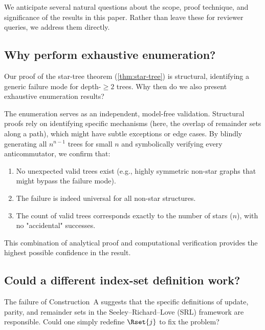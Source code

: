 %

We anticipate several natural questions about the scope, proof
technique, and significance of the results in this paper.  Rather than
leave these for reviewer queries, we address them directly.

\subsection{Why perform exhaustive enumeration?}
\label{sec:concern-proof}

Our proof of the star-tree theorem (\cref{thm:star-tree}) is
structural, identifying a generic failure mode for depth-$\ge 2$ trees.
Why then do we also present exhaustive enumeration results?

The enumeration serves as an independent, model-free validation.
Structural proofs rely on identifying specific mechanisms (here, the
overlap of remainder sets along a path), which might have subtle
exceptions or edge cases.  By blindly generating all $n^{n-1}$ trees
for small $n$ and symbolically verifying every anticommutator, we
confirm that:
\begin{enumerate}
  \item No unexpected valid trees exist (e.g., highly symmetric
    non-star graphs that might bypass the failure mode).
  \item The failure is indeed universal for all non-star structures.
  \item The count of valid trees corresponds exactly to the number
    of stars ($n$), with no "accidental" successes.
\end{enumerate}

This combination of analytical proof and computational verification
provides the highest possible confidence in the result.

\subsection{Could a different index-set definition work?}
\label{sec:concern-analytical}

The failure of Construction~A suggests that the specific definitions
of update, parity, and remainder sets in the Seeley--Richard--Love (SRL)
framework are responsible.  Could one simply redefine $\Rset{j}$ to fix
the problem?

